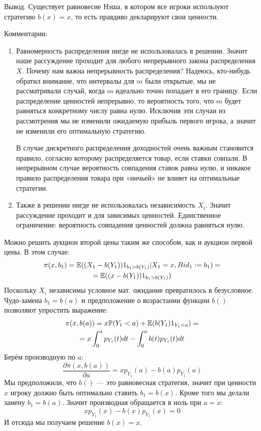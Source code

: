 \begin{enumerate}
Вывод. Существует равновесие Нэша, в котором все игроки используют стратегию $ b(x)=x $, то есть правдиво декларируют свои ценности.

Комментарии:
\begin{enumerate}
\item Равномерность распределения нигде не использовалась в решении. Значит наше рассуждение проходит для любого непрерывного закона распределения $ X $.
Почему нам важна непрерывность распределения? Надеюсь, кто-нибудь обратил внимание, что интервалы для $ m $ были открытые, мы не рассматривали случай, когда $ m $ идеально точно попадает в его границу. Если распределение ценностей непрерывно, то вероятность того, что $ m $ будет равняться конкретному числу равна нулю. Исключив эти случаи из рассмотрения мы не изменили ожидаемую прибыль первого игрока, а значит не изменили его оптимальную стратегию.

В случае дискретного распределения доходностей очень важным становится правило, согласно которому распределяется товар, если ставки совпали. В непрерывном случае вероятность совпадения ставок равна нулю, и никакое правило распределения товара при «ничьей» не влияет на оптимальные стратегии.
\item Также в решении нигде не использовалась независимость $ X_{i} $. Значит рассуждение проходит и для зависимых ценностей. Единственное ограничение: вероятность совпадения ценностей должна равняться нулю.
\end{enumerate}


\begin{myex}
Можно решить аукцион второй цены таким же способом, как и аукцион первой цены. В этом случае:
\begin{multline}
\pi(x,b_{1})=\mathbb{E}((X_{1}-b(Y_{1}))1_{b_{1}>b(Y_{1})}|X_{1}=x,Bid_{1}:=b_{1})=\\
=\mathbb{E}((x-b(Y_{1}))1_{b_{1}>b(Y_{1})})
\end{multline}
Поскольку $ X_{i} $ независимы условное мат. ожидание превратилось в безусловное. Чудо-замена $ b_{1}=b(a) $ и предположение о возрастании функции $ b() $ позволяют упростить выражение:
\begin{multline}
\pi(x,b(a))=x\mathbb{P}(Y_{1}<a)+\mathbb{E}(b(Y_{1})1_{Y_{1}<a})=\\
=x\int_{0}^{a}p_{Y_{1}}(t)dt-\int_{0}^{a}b(t)p_{Y_{1}}(t)dt
\end{multline}
Берём производную по $ a $:
\begin{equation}
\frac{\partial \pi(x,b(a))}{\partial a}=xp_{Y_{1}}(a)-b(a)p_{Y_{1}}(a)
\end{equation}
Мы предположили, что $ b() $ — это равновесная стратегия, значит при ценности $ x $ игроку должно быть оптимально ставить $ b_{1}=b(x) $. Кроме того мы делали замену $ b_{1}=b(a) $. Значит производная обращается в ноль при $ a=x $:
\begin{equation}
xp_{Y_{1}}(x)-b(x)p_{Y_{1}}(x)=0
\end{equation}
И отсюда мы получаем решение $b(x)=x$.


\end{myex}
\end{enumerate}
